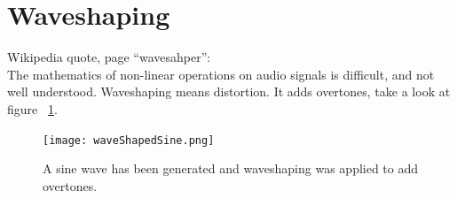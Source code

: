 










\section{Waveshaping}
Wikipedia quote, page ``wavesahper'':\\
\glqq{}The mathematics of non-linear operations on audio signals is difficult, and not well understood.\grqq{}
Waveshaping means distortion. It adds overtones, take a look at figure ~\ref{fig:waveshapedSIne}.


\begin{figure}[h!]
	\centering
	\texttt{[image: waveShapedSine.png]}
	\caption[Wave shaped sine oscillator]
	{A sine wave has been generated and waveshaping was applied to add overtones.}
	\label{fig:waveshapedSIne}
\end{figure}


